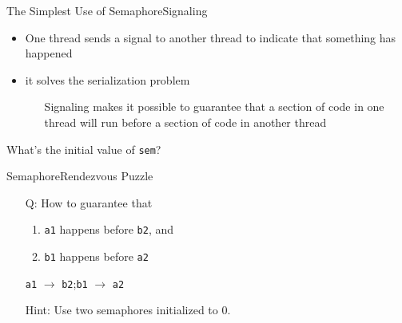 \begin{frame}{The Simplest Use of Semaphore}{Signaling}
  \begin{itemize}
  \item One thread sends a signal to another thread to indicate that something has
    happened
  \item it solves the serialization problem
    \begin{itemize}
    \item[] Signaling makes it possible to guarantee that a section of code in one thread
      will run before a section of code in another thread
    \end{itemize}
  \end{itemize}
  \begin{center}
     
  \end{center}
  \begin{center}
    What's the initial value of \texttt{sem}?
  \end{center}
\end{frame}

\begin{frame}{Semaphore}{Rendezvous Puzzle}
  \begin{center}
     
  \end{center}
  \begin{itemize}
  \item[Q:] How to guarantee that
    \begin{enumerate}
    \item \texttt{a1} happens before \texttt{b2}, and
    \item \texttt{b1} happens before \texttt{a2}
    \end{enumerate}
    \texttt{a1} $\rightarrow{}$ \texttt{b2};\quad \texttt{b1} $\rightarrow{}$ \texttt{a2}
  \item[Hint:] Use two semaphores initialized to 0.
  \end{itemize}
\end{frame}

